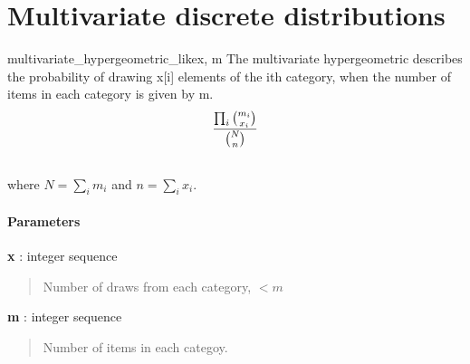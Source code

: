 \section{Multivariate discrete distributions}

\hypertarget{pymc.distributions.multivariate_hypergeometric_like}{}
\begin{funcdesc}{multivariate\_hypergeometric\_like}{x, m}
The multivariate hypergeometric describes the probability of drawing x{[}i{]}
elements of the ith category, when the number of items in each category is
given by m.
\begin{gather}
\begin{split}\frac{\prod_i \binom{m_i}{x_i}}{\binom{N}{n}}\end{split}\notag\\\begin{split}\end{split}\notag
\end{gather}
where $N = \sum_i m_i$ and $n = \sum_i x_i$.
\paragraph{Parameters}\begin{paramlist}

\item[] \textbf{x} : integer sequence
\begin{quote}

Number of draws from each category, $< m$
\end{quote}

\item[] \textbf{m} : integer sequence
\begin{quote}

Number of items in each categoy.
\end{quote}
\end{paramlist}
\end{funcdesc}


